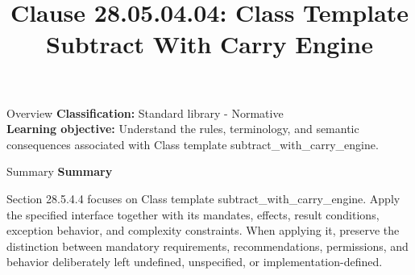 \documentclass[10pt,letterpaper]{article}
\title{Clause 28.05.04.04: Class Template Subtract With Carry Engine}
\author{}
\date{}
\begin{document}
\maketitle
\begin{CornellOverviewBox}{Overview}
\textbf{Classification:} Standard library - Normative\\[2pt]
\textbf{Learning objective:} Understand the rules, terminology, and semantic consequences associated with Class template subtract\_with\_carry\_engine.
\end{CornellOverviewBox}\begin{CornellSummaryBox}{Summary}
{\sffamily\bfseries\color{Accent} Summary}\par\vspace{3pt}Section 28.5.4.4 focuses on Class template subtract\_with\_carry\_engine. Apply the specified interface together with its mandates, effects, result conditions, exception behavior, and complexity constraints. When applying it, preserve the distinction between mandatory requirements, recommendations, permissions, and behavior deliberately left undefined, unspecified, or implementation-defined.
\end{CornellSummaryBox}
\end{document}

